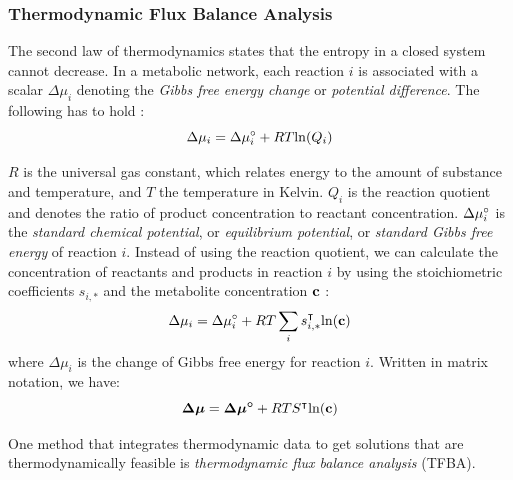 
\subsubsection{Thermodynamic Flux Balance Analysis}
The second law of thermodynamics states that the entropy in a closed system cannot decrease. In a metabolic network, each reaction $i$ is associated with a scalar $\Delta \mu_i$ denoting the \textit{Gibbs free energy change} %
or \textit{potential difference}.
The following has to hold \cite{elimination_infeasible_loops}: 
\begin{equation*}
    \Delta \mu_i = \Delta \mu \degree_i + RT \mathrm{ln} (Q_i)
\end{equation*}

$R$ is the universal gas constant, which relates energy to the amount of substance and temperature, and $T$ the temperature in Kelvin. $Q_i$ is the reaction quotient and denotes the ratio of product concentration to reactant concentration. $\Delta \mu \degree_i$ is the \textit{standard chemical potential}, or \textit{equilibrium potential}, or \textit{standard Gibbs free energy} of reaction $i$.
Instead of using the reaction quotient, we can calculate the concentration of reactants and products in reaction $i$ by using the stoichiometric coefficients $s_{i,*}$ and the metabolite concentration $\bold c$ \cite{noor_removing_2018}:
\begin{equation*}
    \Delta \mu_i = \Delta \mu \degree_i + RT \sum_{i} s_{i,*}^\intercal \mathrm{ln} (\bold c)
    \label{Eq:lawOfThermodynamics}
\end{equation*}
where $\Delta \mu_i$ is the change of Gibbs free energy for reaction $i$. 
Written in matrix notation, we have:
\begin{equation}
   \boldsymbol{\Delta \mu} = \boldsymbol{\Delta \mu \degree} + RT S^\intercal \mathrm{ln}(\bold c)
\end{equation}

One method that integrates thermodynamic data to get solutions that are thermodynamically feasible is \textit{thermodynamic flux balance analysis} (TFBA). 

